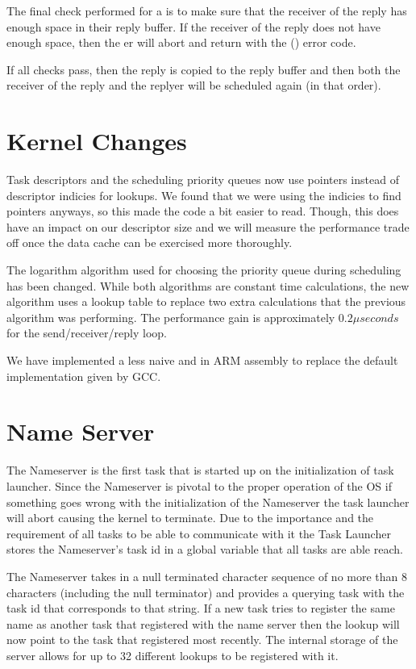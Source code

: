\documentclass[pdftex,10pt,a4paper]{article}
\begin{document}
The final check performed for a  is to make sure that the
receiver of the reply has enough space in their reply buffer. If the
receiver of the reply does not have enough space, then the
er will abort and return with the 
() error code.

If all checks pass, then the reply is copied to the reply buffer and
then both the receiver of the reply and the replyer will be scheduled
again (in that order).

\section*{Kernel Changes}

Task descriptors and the scheduling priority queues now use pointers
instead of descriptor indicies for lookups. We found that we were
using the indicies to find pointers anyways, so this made the code a
bit easier to read. Though, this does have an impact on our descriptor
size and we will measure the performance trade off once the data cache
can be exercised more thoroughly.

The logarithm algorithm used for choosing the priority queue during
scheduling has been changed. While both algorithms are constant time
calculations, the new algorithm uses a lookup table to replace two
extra calculations that the previous algorithm was performing. The
performance gain is approximately $0.2 \mu seconds$ for the
send/receiver/reply loop.

We have implemented a less naive  and  in ARM
assembly to replace the default implementation given by GCC.


\section*{Name Server}

The Nameserver is the first task that is started up on the
initialization of task launcher. Since the Nameserver is pivotal to
the proper operation of the OS if something goes wrong with the
initialization of the Nameserver the task launcher will abort causing
the kernel to terminate. Due to the importance and the requirement of
all tasks to be able to communicate with it the Task Launcher stores
the Nameserver’s task id in a global variable that all tasks are able
reach.

The Nameserver takes in a null terminated character sequence of no
more than 8 characters (including the null terminator) and provides a
querying task with the task id that corresponds to that string. If a
new task tries to register the same name as another task that
registered with the name server then the lookup will now point to the
task that registered most recently. The internal storage of the server
allows for up to 32 different lookups to be registered with it.
\end{document}

